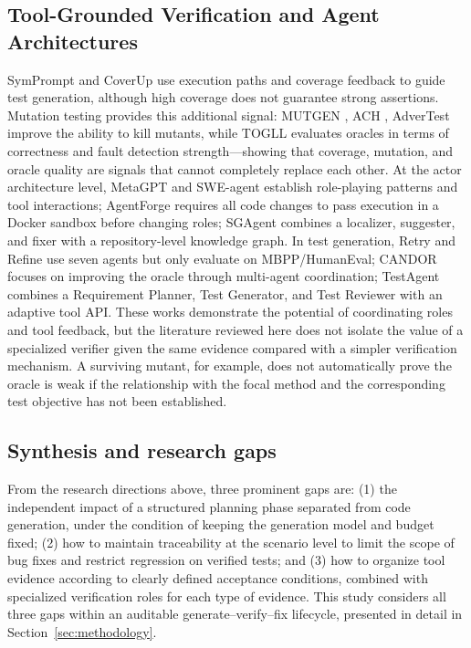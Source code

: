 \documentclass[pdflatex,sn-basic,Numbered,iicol]{sn-jnl}
\begin{document}
\subsection{Tool-Grounded Verification and Agent Architectures}\label{subsec:rw-verification}

SymPrompt \cite{bib11} and CoverUp \cite{bib12} use execution paths and coverage feedback to guide test generation, although high coverage does not guarantee strong assertions. Mutation testing provides this additional signal: MUTGEN \cite{bib13}, ACH \cite{bib14}, AdverTest \cite{bib15} improve the ability to kill mutants, while TOGLL \cite{bib16} evaluates oracles in terms of correctness and fault detection strength---showing that coverage, mutation, and oracle quality are signals that cannot completely replace each other. At the actor architecture level, MetaGPT \cite{bib17} and SWE-agent \cite{bib18} establish role-playing patterns and tool interactions; AgentForge \cite{bib19} requires all code changes to pass execution in a Docker sandbox before changing roles; SGAgent \cite{bib20} combines a localizer, suggester, and fixer with a repository-level knowledge graph. In test generation, Retry and Refine \cite{bib21} use seven agents but only evaluate on MBPP/HumanEval; CANDOR \cite{bib22} focuses on improving the oracle through multi-agent coordination; TestAgent \cite{bib23} combines a Requirement Planner, Test Generator, and Test Reviewer with an adaptive tool API. These works demonstrate the potential of coordinating roles and tool feedback, but the literature reviewed here does not isolate the value of a specialized verifier given the same evidence compared with a simpler verification mechanism. A surviving mutant, for example, does not automatically prove the oracle is weak if the relationship with the focal method and the corresponding test objective has not been established.

\subsection{Synthesis and research gaps}\label{subsec:rw-synthesis}

From the research directions above, three prominent gaps are: (1) the independent impact of a structured planning phase separated from code generation, under the condition of keeping the generation model and budget fixed; (2) how to maintain traceability at the scenario level to limit the scope of bug fixes and restrict regression on verified tests; and (3) how to organize tool evidence according to clearly defined acceptance conditions, combined with specialized verification roles for each type of evidence. This study considers all three gaps within an auditable generate--verify--fix lifecycle, presented in detail in Section~\ref{sec:methodology}.
\end{document}
